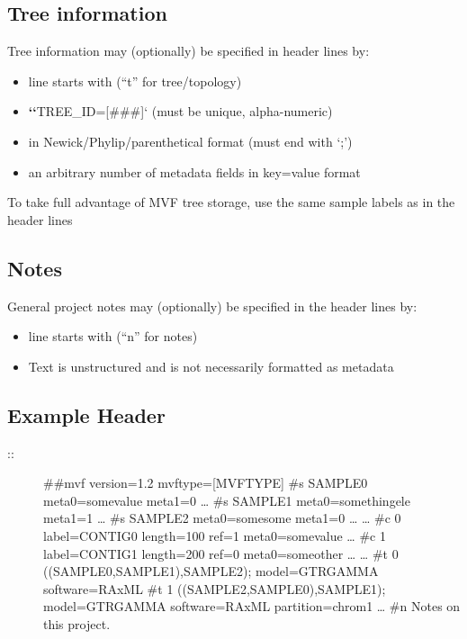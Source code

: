 \documentclass[letterpaper,11pt,english]{sphinxmanual}
\begin{document}
\subsection{Tree information}
\label{\detokenize{mvf_spec:tree-information}}
Tree information may (optionally) be specified in header lines by:
\begin{itemize}
\item {} 
line starts with  (“t” for tree/topology)

\item {} 
{\color{red}\bfseries{}{}`{}`}TREE\_ID={[}\#\#\#{]}{}` (must be unique, alpha-numeric)

\item {} 
 in Newick/Phylip/parenthetical format (must end with ‘;’)

\item {} 
an arbitrary number of metadata fields in key=value format

\end{itemize}

To take full advantage of MVF tree storage, use the same sample labels as in the  header lines


\subsection{Notes}
\label{\detokenize{mvf_spec:notes}}
General project notes may (optionally) be specified in the header lines by:
\begin{itemize}
\item {} 
line starts with  (“n” for notes)

\item {} 
Text is unstructured and is not necessarily formatted as metadata

\end{itemize}


\subsection{Example Header}
\label{\detokenize{mvf_spec:example-header}}\begin{description}
\item[{::}] \leavevmode
\#\#mvf version=1.2 mvftype={[}MVFTYPE{]}
\#s SAMPLE0 meta0=somevalue meta1=0 …
\#s SAMPLE1 meta0=somethingele meta1=1 …
\#s SAMPLE2 meta0=somesome meta1=0 …
…
\#c 0 label=CONTIG0 length=100 ref=1 meta0=somevalue …
\#c 1 label=CONTIG1 length=200 ref=0 meta0=someother …
…
\#t 0 ((SAMPLE0,SAMPLE1),SAMPLE2); model=GTRGAMMA software=RAxML
\#t 1 ((SAMPLE2,SAMPLE0),SAMPLE1); model=GTRGAMMA software=RAxML partition=chrom1
…
\#n Notes on this project.

\end{description}
\end{document}
